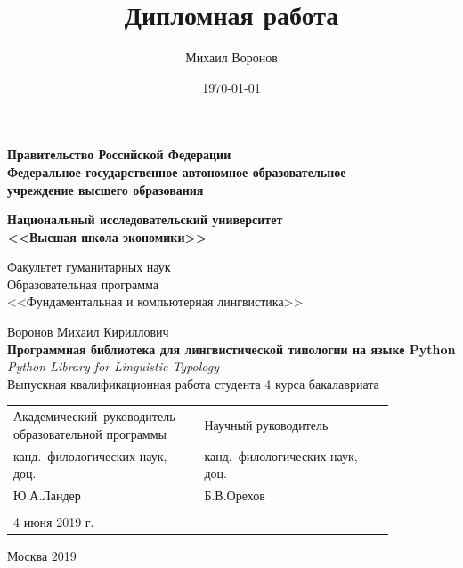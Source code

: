 \documentclass[a4paper,12pt]{article}
\author{Михаил Воронов}
\title{Дипломная работа}
\date{\today}
\begin{document}

\newpage
\thispagestyle{empty}
\begin{center}
    \textbf{Правительство Российской Федерации \\
        Федеральное государственное автономное образовательное \\
        учреждение высшего образования}
    \vspace{1cm}

    \textbf{Национальный исследовательский университет \\ <<Высшая школа экономики>>}
\end{center}

\vspace{1cm}
\begin{flushright}
    \noindent
    Факультет гуманитарных наук \\
    Образовательная программа \\
    <<Фундаментальная и компьютерная лингвистика>>
\end{flushright}

\begin{center}
    Воронов Михаил Кириллович \\
    \vspace{2ex}
    \textbf{Программная библиотека для лингвистической типологии на языке Python} \\
    \textit{Python Library for Linguistic Typology}\\
    \vspace{3ex}
    Выпускная квалификационная работа студента 4 курса бакалавриата 
\end{center}
\vspace{3ex}
\begin{tabular}{p{0.4\linewidth}p{0.45\linewidth}}
    Академический~руководитель образовательной программы & Научный руководитель \\
    канд.~филологических наук, доц. & канд.~филологических наук, доц.\\
    Ю.А.Ландер & Б.В.Орехов \\
    & \\ 
    4 июня 2019 г.
\end{tabular}

\begin{center}
    Москва 2019
\end{center}

\newpage

\setcounter{tocdepth}{2}
\tableofcontents
\end{document}
